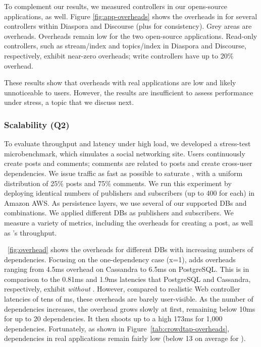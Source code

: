 To complement our \crowdtap results, we measured controllers in our opens-source
applications, as well. Figure \ref{fig:app-overheads} shows the \synapse
overheads in for several controllers within Diaspora and Discourse (plus
\crowdtap for consistency). Grey areas are \synapse overheads. Overheads
remain low for the two open-source applications. Read-only controllers, such as
{\code stream/index} and {\code topics/index} in Diaspora and Discourse,
respectively, exhibit near-zero overheads; write controllers have up to 20\%
overhead.

These results show that \synapse overheads with real applications are low and
likely unnoticeable to users. However, the results are insufficient to assess
performance under stress, a topic that we discuss next.

\subsubsection{Scalability (Q2)}
\label{sec:evaluation:scalability}

To evaluate \synapse throughput and latency under high load, we developed a
stress-test microbenchmark, which simulates a social networking site. Users
continuously create posts and comments; comments are related to posts and create
cross-user dependencies. We issue traffic as fast as possible to saturate \synapse, with a
uniform distribution of 25\% posts and 75\% comments. We run this experiment
by deploying identical numbers of publishers and subscribers (up to 400 for
each) in Amazon AWS. As persistence layers, we use several of our supported
DBs and combinations. We applied different DBs as publishers and
subscribers. We measure a variety of metrics, including the overheads for
creating a post, as well as \synapse's throughput.

\F~\ref{fig:overhead} shows the overheads for different DBs with increasing
numbers of dependencies. Focusing on the one-dependency case (x=1), \synapse
adds overheads ranging from 4.5ms overhead on Cassandra to 6.5ms on PostgreSQL.
This is in comparison to the 0.81ms and 1.9ms latencies that PostgreSQL and
Cassandra, respectively, exhibit {\em without} \synapse. However, compared to
realistic Web controller latencies of tens of ms, these overheads are barely
user-visible. As the number of dependencies increases, the overhead grows slowly
at first, remaining below 10ms for up to 20 dependencies. It then shoots up to a
high 173ms for 1,000 dependencies. Fortunately, as shown in
Figure~\ref{tab:crowdtap-overheads}, dependencies in real applications remain
fairly low (below 13 on average for \crowdtap).

